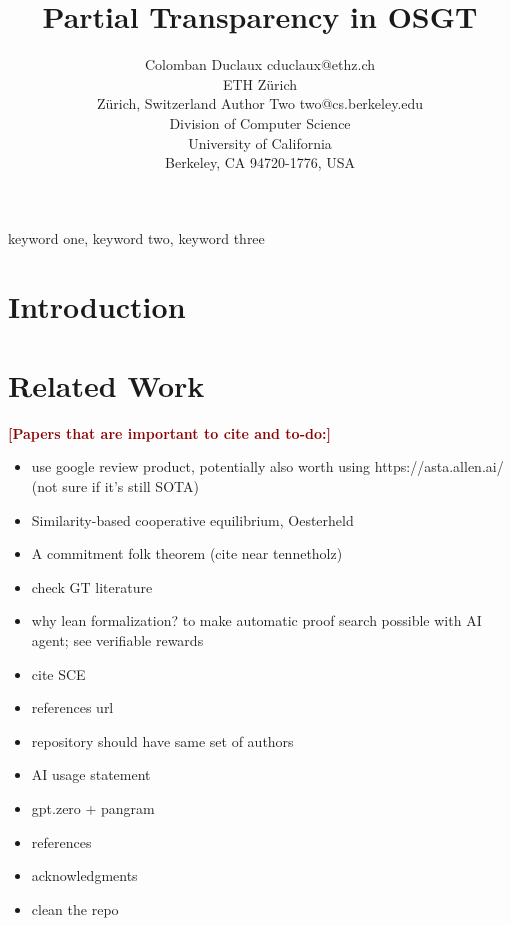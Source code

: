 \documentclass[twoside,11pt]{article}
\newcommand{\boldred}[1]{\textbf{\textcolor{darkred}{#1}}}
\begin{document}
\title{Partial Transparency in OSGT}

\author{\name Colomban Duclaux \email cduclaux@ethz.ch \\
       ETH Zürich\\
       Zürich, Switzerland
       \AND
       \name Author Two \email two@cs.berkeley.edu \\
       \addr Division of Computer Science\\
       University of California\\
       Berkeley, CA 94720-1776, USA}


\maketitle

\begin{abstract}%
\blindtext
\end{abstract}

\begin{keywords}
  keyword one, keyword two, keyword three
\end{keywords}

\tableofcontents

\section{Introduction}

\section{Related Work}
\label{section:RelatedWorks}

\boldred{[Papers that are important to cite and to-do:]}
\begin{itemize}
\item use google review product, potentially also worth using https://asta.allen.ai/ (not sure if it's still SOTA)
    \item Similarity-based cooperative equilibrium, Oesterheld
    \item A commitment folk theorem (cite near tennetholz)
    \item check GT literature
    \item why lean formalization? to make automatic proof search possible with AI agent; see verifiable rewards
    \item cite SCE 
    \item references url
    \item repository should have same set of authors
    \item AI usage statement
    \item gpt.zero + pangram
    \item references
    \item acknowledgments
    \item clean the repo
\end{itemize}
\end{document}
